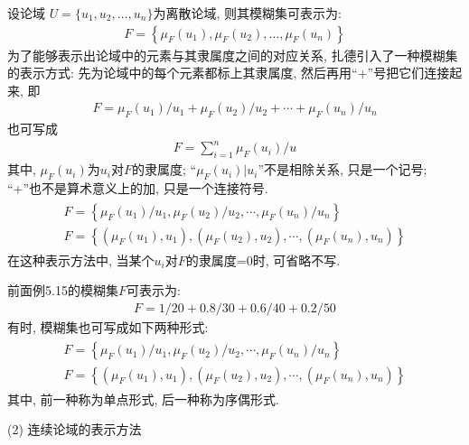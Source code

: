 {设论域 $U=\{u_1, u_ 2, \ldots, u_n\}$为离散论域, 则其模糊集可表示为:
\begin{align}
  F=\left\{\mu_{F}\left(u_{1}\right), \mu_{F}\left(u_{2}\right), \ldots, \mu_{F}\left(u_{n}\right)\right\}
\end{align}
为了能够表示出论域中的元素与其隶属度之间的对应关系, 扎德引入了一种模糊集的表示方式: 先为论域中的每个元素都标上其隶属度, 然后再用“+”号把它们连接起来, 即
\begin{align}
  F=\mu_{F}\left(u_{1}\right) / u_{1}+\mu_{F}\left(u_{2}\right) / u_{2}+\cdots+\mu_{F}\left(u_{n}\right) / u_{n}
\end{align}
也可写成
\begin{align}
  F=\sum_{i=1}^{n} \mu_{F}\left(u_{i}\right) / u
\end{align}
其中, $\mu_{F}\left(u_{i}\right)$为$u_i$对$F$的隶属度; “$\mu_{F}\left(u_{i}\right) |u_{i}$”不是相除关系, 只是一个记号; “+”也不是算术意义上的加, 只是一个连接符号.
\begin{align}
\begin{array}{ll}
F=\left\{\mu_{F}\left(u_{1}\right) / u_{1}, \mu_{F}\left(u_{2}\right) / u_{2}, \cdots, \mu_{F}\left(u_{n}\right) / u_{n}\right\} \\
F=\left\{\left(\mu_{F}\left(u_{1}\right), u_{1}\right),\left(\mu_{F}\left(u_{2}\right), u_{2}\right), \cdots,\left(\mu_{F}\left(u_{n}\right), u_{n}\right)\right\}
\end{array}
\end{align}
在这种表示方法中, 当某个$u_i$对$F$的隶属度=0时, 可省略不写.
\begin{example}
前面例5.15的模糊集$F$可表示为:
\begin{align}
  F=1 / 20+0.8 / 30+0.6 / 40+0.2 / 50
\end{align}
    有时, 模糊集也可写成如下两种形式:
\begin{align}
\begin{array}{l}
F=\left\{\mu_{F}\left(u_{1}\right) / u_{1}, \mu_{F}\left(u_{2}\right) / u_{2}, \cdots, \mu_{F}\left(u_{n}\right) / u_{n}\right\} \\
F=\left\{\left(\mu_{F}\left(u_{1}\right), u_{1}\right),\left(\mu_{F}\left(u_{2}\right), u_{2}\right), \cdots,\left(\mu_{F}\left(u_{n}\right), u_{n}\right)\right\}
\end{array}
\end{align}
其中, 前一种称为单点形式, 后一种称为序偶形式.
\end{example}

 (2) 连续论域的表示方法

}
